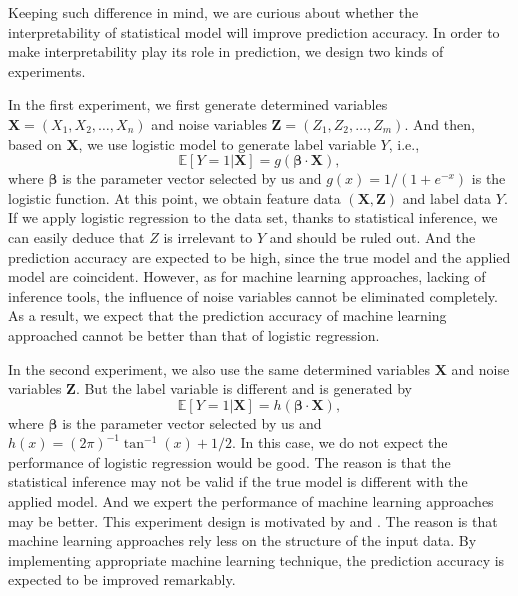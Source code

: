 \documentclass[12pt]{article}
\begin{document}
Keeping such difference in mind, we are curious about whether the interpretability of statistical model will improve prediction accuracy. In order to make interpretability play its role in prediction, we design two kinds of experiments.

In the first experiment, we first generate determined variables $\mathbf{X} = (X_1, X_2, \dots, X_n)$ and noise variables $\mathbf{Z} = (Z_1, Z_2, \dots, Z_m)$. And then, based on $\mathbf{X}$, we use logistic model to generate label variable $Y$, i.e.,
\begin{equation}
\mathbb{E}\left[Y=1 | \mathbf{X}\right] = g\left( \mathbf{\beta} \cdot \mathbf{X}\right), \label{eq1}
\end{equation}
where $\mathbf{\beta}$ is the parameter vector selected by us and $g(x)= 1/(1+ e^{-x})$ is the logistic function. At this point, we obtain feature data $(\mathbf{X}, \mathbf{Z})$ and label data $Y$. If we apply logistic regression to the data set, thanks to statistical inference, we can easily deduce that $Z$ is irrelevant to $Y$ and should be ruled out. And the prediction accuracy are expected to be high, since the true model and the applied model are coincident. However, as for machine learning approaches, lacking of inference tools, the influence of noise variables cannot be eliminated completely. As a result, we expect that the prediction accuracy of machine learning approached cannot be better than that of logistic regression.

In the second experiment, we also use the same determined variables $\mathbf{X}$ and noise variables $\mathbf{Z}$. But the label variable is different and is generated by
\begin{equation}
\mathbb{E}\left[Y=1 | \mathbf{X}\right] = h\left( \mathbf{\beta} \cdot \mathbf{X}\right),  \label{eq2}
\end{equation}
where $\mathbf{\beta}$ is the parameter vector selected by us and $h(x)= (2 \pi)^{-1} \tan^{-1}(x) + 1/2$. In this case, we do not expect the performance of logistic regression would be good. The reason is that the statistical inference may not be valid if the true model is different with the applied model. And we expert the performance of machine learning approaches may be better. This experiment design is motivated by \cite{casella2002statistical} and \cite{jankowski2004comparison}. The reason is that machine learning approaches rely less on the structure of the input data. By implementing appropriate machine learning technique, the prediction accuracy is expected to be improved remarkably.
\end{document}
